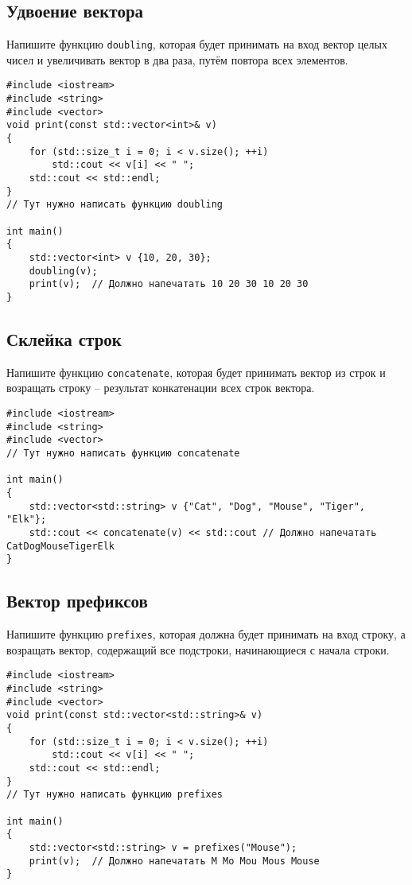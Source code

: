 \documentclass{article}
\begin{document}
\subsection{Удвоение вектора}
Напишите функцию \texttt{doubling}, которая будет принимать на вход вектор целых чисел и увеличивать вектор в два раза, путём повтора всех элементов.
\begin{lstlisting}
#include <iostream>
#include <string>
#include <vector>
void print(const std::vector<int>& v)
{
    for (std::size_t i = 0; i < v.size(); ++i)
        std::cout << v[i] << " ";
    std::cout << std::endl;
}
// Тут нужно написать функцию doubling

int main()
{
    std::vector<int> v {10, 20, 30};
    doubling(v);
    print(v);  // Должно напечатать 10 20 30 10 20 30
}
\end{lstlisting}


\subsection{Склейка строк}
Напишите функцию \texttt{concatenate}, которая будет принимать вектор из строк и возращать строку -- результат конкатенации всех строк вектора.
\begin{lstlisting}
#include <iostream>
#include <string>
#include <vector>
// Тут нужно написать функцию concatenate

int main()
{
	std::vector<std::string> v {"Cat", "Dog", "Mouse", "Tiger", "Elk"};
	std::cout << concatenate(v) << std::cout // Должно напечатать CatDogMouseTigerElk
}
\end{lstlisting}

\subsection{Вектор префиксов}
Напишите функцию \texttt{prefixes}, которая должна будет принимать на вход строку, а возращать вектор, содержащий все подстроки, начинающиеся с начала строки.
\begin{lstlisting}
#include <iostream>
#include <string>
#include <vector>
void print(const std::vector<std::string>& v)
{
    for (std::size_t i = 0; i < v.size(); ++i)
        std::cout << v[i] << " ";
    std::cout << std::endl;
}
// Тут нужно написать функцию prefixes

int main()
{
    std::vector<std::string> v = prefixes("Mouse");
    print(v);  // Должно напечатать M Mo Mou Mous Mouse
}
\end{lstlisting}
\end{document}

